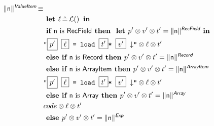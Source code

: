 \documentclass{llncs}
\newcommand{\trad}[2]{\ensuremath{\lVert \textsf{#1} \rVert^{\textit{#2}}}}
\newcommand{\nl}[0]{\ensuremath{\downarrow}}
\DeclareMathOperator{\isdef}{\equiv}
\DeclareMathOperator{\lbl}{\mathcal{L}()}
\newcommand{\llvm}[1]{\texttt{#1}}
\newcommand{\B}[1]{\textsf{#1}}
\newcommand{\IF}[0]{\textbf{ if }}
\newcommand{\ELSIF}[0]{\textbf{ else if }}
\newcommand{\ELSE}[0]{\textbf{ else }}
\newcommand{\THEN}[0]{\textbf{ then }}
\newcommand{\LET}[0]{\textbf{ let }}
\DeclareMathOperator{\BE}{\hat{=}}
\newcommand{\IN}[0]{\textbf{ in }}
\newcommand{\PH}[1]{\framebox{$#1$}}
\newcommand{\sep}[0]{\otimes}
\begin{document}
\begin{align*}
\begin{split}
  \trad{n}{\B{ValueItem}} \isdef \\
   & \LET \ell \BE \lbl  \IN\\
   & \IF \B{n} \mbox{ is \B{RecField}} \THEN \LET p' \sep v' \sep t' = \trad{\B{n}}{\B{RecField}} \IN \\
   & \llvm{"\PH{p'} \PH{\ell}  = load  \PH{t'}* \PH{v'} \nl"} \sep  \ell  \sep t'\\
   & \ELSIF \B{n} \mbox{ is \B{Record}} \THEN p' \sep v' \sep t' = \trad{\B{n}}{\B{Record}} \\
   & \ELSIF \B{n} \mbox{ is \B{ArrayItem}} \THEN p' \sep v' \sep t' = \trad{\B{n}}{\B{ArrayItem}} \\
   & \llvm{"\PH{p'} \PH{\ell}  = load  \PH{t'}* \PH{v'} \nl"} \sep  \ell  \sep t'\\
   & \ELSIF \B{n} \mbox{ is \B{Array}} \THEN p' \sep v' \sep t' = \trad{\B{n}}{\B{Array}} \\
   & code \sep  \ell  \sep t'\\
   & \ELSE  p' \sep v' \sep t' = \trad{\B{n}}{\B{Exp}}
\end{split}
\end{align*}
\end{document}
